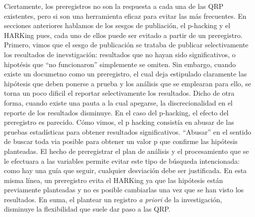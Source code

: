 \documentclass[
]{book}
\begin{document}
Ciertamente, los preregistros no son la respuesta a cada una de las QRP existentes, pero si son una herramienta eficaz para evitar las más frecuentes. En secciones anteriores hablamos de los sesgos de publiación, el p-hacking y el HARKing pues, cada uno de ellos puede ser evitado a partir de un preregistro. Primero, vimos que el sesgo de publicación se trataba de publicar selectivamente los resultados de inevstigación: resultados que no hayan sido significativos, o hipotésis que ``no funcionaron'' simplemente se omiten. Sin embargo, cuando existe un documetno como un preregistro, el cual deja estipulado claramente las hipótesis que deben ponerse a prueba y los análisis que se emplearan para ello, se torna un poco dificil el reportar selectivamente los resultados. Dicho de otra forma, cuando existe una pauta a la cual apegarse, la discrecionalidad en el reporte de los resultados disminuye. En el caso del p-hacking, el efecto del preregistro es parecido. Cómo vimos, el p hacking consistía en abusar de las pruebas estadísticas para obtener resultados significativos. ``Abusar'' en el sentido de buscar toda via posible para obtener un valor p que confirme las hipótesis planteadas. El hecho de preregistrar el plan de análisis y el procesamiento que se le efectuara a las variables permite evitar este tipo de búsqueda intencionada: como hay una guía que seguir, cualquier desviación debe ser justificada. En esta misma línea, un preregistro evita el HARKing ya que las hipótesis están previamente planteadas y no es posible cambiarlas una vez que se han visto los resultados. En suma, el plantear un registro \emph{a priori} de la investigación, disminuye la flexibilidad que suele dar paso a las QRP.
\end{document}
